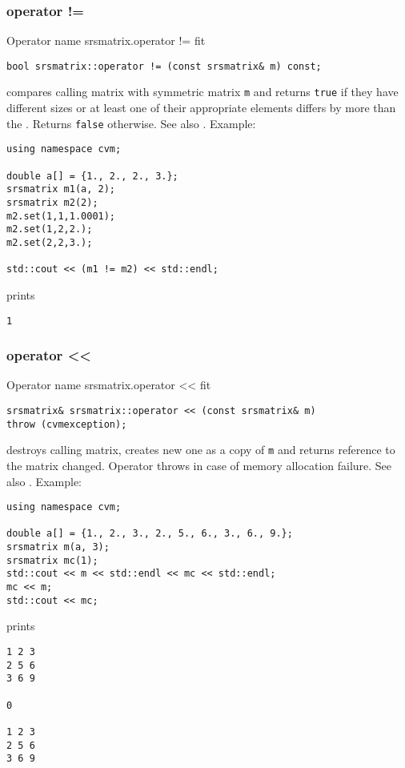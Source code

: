 \subsubsection{operator !=}
Operator%
\pdfdest name {srsmatrix.operator !=} fit
\begin{verbatim}
bool srsmatrix::operator != (const srsmatrix& m) const;
\end{verbatim}
compares  calling matrix with symmetric matrix \verb"m"
and returns \verb"true" if they have different sizes
or at least one of their appropriate elements
differs by more than the
.
Returns \verb"false" otherwise.
See also .
Example:
\begin{Verbatim}
using namespace cvm;

double a[] = {1., 2., 2., 3.};
srsmatrix m1(a, 2);
srsmatrix m2(2);
m2.set(1,1,1.0001); 
m2.set(1,2,2.);
m2.set(2,2,3.);

std::cout << (m1 != m2) << std::endl;
\end{Verbatim}
prints
\begin{Verbatim}
1
\end{Verbatim}
\newpage



\subsubsection{operator <{}<}
Operator%
\pdfdest name {srsmatrix.operator <<} fit
\begin{verbatim}
srsmatrix& srsmatrix::operator << (const srsmatrix& m)
throw (cvmexception);
\end{verbatim}
destroys  calling matrix, creates  new one as a copy of \verb"m"
and returns  reference to
the matrix changed.
Operator throws  
in case of memory allocation failure.
See also .
Example:
\begin{Verbatim}
using namespace cvm;

double a[] = {1., 2., 3., 2., 5., 6., 3., 6., 9.};
srsmatrix m(a, 3);
srsmatrix mc(1);
std::cout << m << std::endl << mc << std::endl;
mc << m;
std::cout << mc;
\end{Verbatim}
prints
\begin{Verbatim}
1 2 3
2 5 6
3 6 9

0

1 2 3
2 5 6
3 6 9
\end{Verbatim}
\newpage



